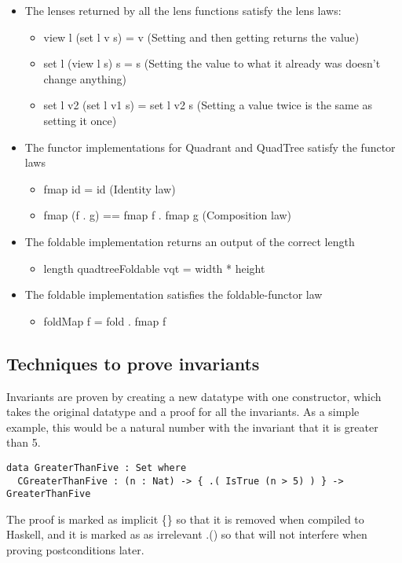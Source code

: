 \begin{itemize}
    \item The lenses returned by all the lens functions satisfy the lens laws: \cite{lens}
        \begin{itemize}
            \item view l (set l v s) = v (Setting and then getting returns the value)
            \item set l (view l s) s = s (Setting the value to what it already was doesn't change anything)
            \item set l v2 (set l v1 s) = set l v2 s (Setting a value twice is the same as setting it once)
        \end{itemize}
    \item The functor implementations for Quadrant and QuadTree satisfy the functor laws
        \begin{itemize}
            \item fmap id = id (Identity law)
            \item fmap (f . g) == fmap f . fmap g (Composition law)
        \end{itemize}
    \item The foldable implementation returns an output of the correct length
        \begin{itemize}
            \item length quadtreeFoldable vqt = width * height
        \end{itemize}
    \item The foldable implementation satisfies the foldable-functor law
        \begin{itemize}
            \item foldMap f = fold . fmap f
        \end{itemize}
\end{itemize}

\subsection{Techniques to prove invariants}
Invariants are proven by creating a new datatype with one constructor, which takes the original datatype and a proof for all the invariants. As a simple example, this would be a natural number with the invariant that it is greater than 5.
\begin{verbatim}
data GreaterThanFive : Set where
  CGreaterThanFive : (n : Nat) -> { .( IsTrue (n > 5) ) } -> GreaterThanFive
\end{verbatim}
The proof is marked as implicit \{\} so that it is removed when compiled to Haskell, and it is marked as as irrelevant .() so that will not interfere when proving postconditions later. 

